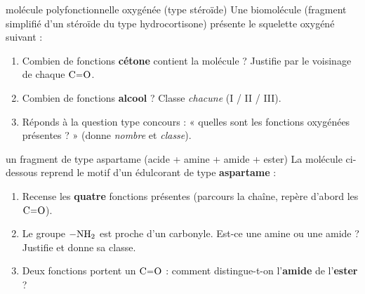\documentclass[11pt,a4paper]{article}
\begin{document}
\begin{exo}{molécule polyfonctionnelle oxygénée (type stéroïde)}
Une biomolécule (fragment simplifié d'un stéroïde du type hydrocortisone) présente le squelette oxygéné suivant :
\begin{center}\end{center}
\begin{enumerate}[label=\textbf{\alph*)},leftmargin=2em,itemsep=1pt]
  \item Combien de fonctions \textbf{cétone} contient la molécule ? Justifie par le voisinage de chaque $\ce{C=O}$.
  \item Combien de fonctions \textbf{alcool} ? Classe \emph{chacune} (I / II / III).
  \item Réponds à la question type concours : « quelles sont les fonctions oxygénées présentes ? » (donne \emph{nombre} et \emph{classe}).
\end{enumerate}
\end{exo}

\begin{exo}{un fragment de type aspartame (acide + amine + amide + ester)}
La molécule ci-dessous reprend le motif d'un édulcorant de type \textbf{aspartame} :
\begin{center}\end{center}
\begin{enumerate}[label=\textbf{\alph*)},leftmargin=2em,itemsep=1pt]
  \item Recense les \textbf{quatre} fonctions présentes (parcours la chaîne, repère d'abord les $\ce{C=O}$).
  \item Le groupe $\ce{-NH2}$ est proche d'un carbonyle. Est-ce une amine ou une amide ? Justifie et donne sa classe.
  \item Deux fonctions portent un $\ce{C=O}$ : comment distingue-t-on l'\textbf{amide} de l'\textbf{ester} ?
\end{enumerate}
\end{exo}
\end{document}
